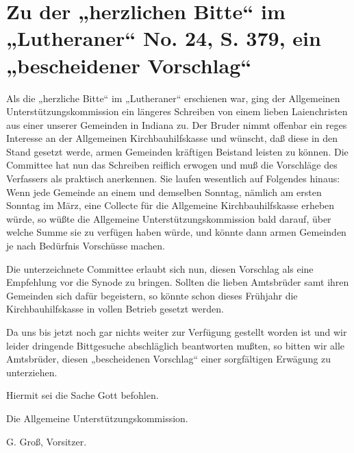 \chapter[Ein bescheidener Vorschlag]{Zu der „herzlichen Bitte“ im „Lutheraner“ No. 24, S. 379, ein „bescheidener Vorschlag“}

Als die „herzliche Bitte“ im „Lutheraner“ erschienen war, ging der Allgemeinen Unterstützungskommission ein längeres Schreiben von einem lieben Laienchristen aus einer unserer Gemeinden in Indiana zu. Der Bruder nimmt offenbar ein reges Interesse an der Allgemeinen Kirchbauhilfskasse und wünscht, daß diese in den Stand gesetzt werde, armen Gemeinden kräftigen Beistand leisten zu können. Die Committee hat nun das Schreiben reiflich erwogen und muß die Vorschläge des Verfassers als praktisch anerkennen. Sie laufen wesentlich auf Folgendes hinaus: Wenn jede Gemeinde an einem und demselben Sonntag, nämlich am ersten Sonntag im März, eine Collecte für die Allgemeine Kirchbauhilfskasse erheben würde, so wüßte die Allgemeine Unterstützungskommission bald darauf, über welche Summe sie zu verfügen haben würde, und könnte dann armen Gemeinden je nach Bedürfnis Vorschüsse machen.

Die unterzeichnete Committee erlaubt sich nun, diesen Vorschlag als eine Empfehlung vor die Synode zu bringen. Sollten die lieben Amtsbrüder samt ihren Gemeinden sich dafür begeistern, so könnte schon dieses Frühjahr die Kirchbauhilfskasse in vollen Betrieb gesetzt werden.

Da uns bis jetzt noch gar nichts weiter zur Verfügung gestellt worden ist und wir leider dringende Bittgesuche abschläglich beantworten mußten, so bitten wir alle Amtsbrüder, diesen „bescheidenen Vorschlag“ einer sorgfältigen Erwägung zu unterziehen.

Hiermit sei die Sache Gott befohlen.

Die Allgemeine Unterstützungskommission.

G. Groß, Vorsitzer.
